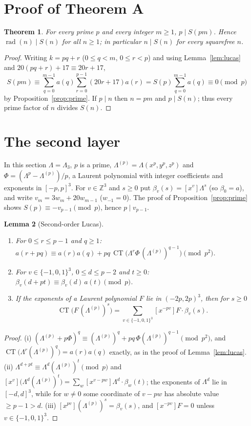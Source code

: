 \documentclass[11pt]{amsart}
\newtheorem{theorem}{Theorem}[section]
\newtheorem{lemma}[theorem]{Lemma}
\theoremstyle{definition}
\newcommand{\Z}{\mathbb{Z}}
\newcommand{\CT}{\operatorname{CT}}
\newcommand{\rad}{\operatorname{rad}}
\begin{document}
\section{Proof of Theorem A}

\begin{theorem}\label{thm:A}
For every prime $p$ and every integer $m\ge1$, $p\mid S(pm)$. Hence $\rad(n)\mid S(n)$ for all
$n\ge1$; in particular $n\mid S(n)$ for every squarefree $n$.
\end{theorem}

\begin{proof}
Writing $k=pq+r$ ($0\le q<m$, $0\le r<p$) and using Lemma~\ref{lem:lucas} and
$20(pq+r)+17\equiv20r+17$,
\[
S(pm)\equiv\sum_{q=0}^{m-1}a(q)\sum_{r=0}^{p-1}(20r+17)a(r)=S(p)\sum_{q=0}^{m-1}a(q)\equiv0
\pmod p
\]
by Proposition~\ref{prop:prime}. If $p\mid n$ then $n=pm$ and $p\mid S(n)$; thus every prime
factor of $n$ divides $S(n)$.
\end{proof}

\section{The second layer}\label{sec:layer2}

In this section $\Lambda=\Lambda_3$, $p$ is a prime, $\Lambda^{(p)}=\Lambda(x^p,y^p,z^p)$ and
$\Phi=(\Lambda^p-\Lambda^{(p)})/p$, a Laurent polynomial with integer coefficients and exponents in
$[-p,p]^3$. For $v\in\Z^3$ and $s\ge0$ put $\beta_v(s)=[x^v]\Lambda^s$ (so $\beta_0=a$), and write
$v_m=3w_m+20w_{m-1}$ ($w_{-1}=0$). The proof of Proposition~\ref{prop:prime} shows
$S(p)\equiv-v_{p-1}\pmod p$, hence $p\mid v_{p-1}$.

\begin{lemma}[Second-order Lucas]\label{lem:lucas2}
\begin{enumerate}[label=(\roman*)]
\item For $0\le r\le p-1$ and $q\ge1$:
$a(r+pq)\equiv a(r)a(q)+pq\,\CT\big(\Lambda^r\Phi\,(\Lambda^{(p)})^{q-1}\big)\pmod{p^2}$.
\item For $v\in\{-1,0,1\}^3$, $0\le d\le p-2$ and $t\ge0$: $\beta_v(d+pt)\equiv\beta_v(d)\,a(t)\pmod p$.
\item If the exponents of a Laurent polynomial $F$ lie in $(-2p,2p)^3$, then for $s\ge0$
\[\CT\big(F\,(\Lambda^{(p)})^s\big)=\sum_{v\in\{-1,0,1\}^3}[x^{-pv}]F\cdot\beta_v(s).\]
\end{enumerate}
\end{lemma}

\begin{proof}
(i) $(\Lambda^{(p)}+p\Phi)^q\equiv(\Lambda^{(p)})^q+pq\,\Phi(\Lambda^{(p)})^{q-1}\pmod{p^2}$, and
$\CT\big(\Lambda^r(\Lambda^{(p)})^q\big)=a(r)a(q)$ exactly, as in the proof of Lemma~\ref{lem:lucas}.
(ii) $\Lambda^{d+pt}\equiv\Lambda^d(\Lambda^{(p)})^t\pmod p$ and
$[x^v]\big(\Lambda^d(\Lambda^{(p)})^t\big)=\sum_{w}[x^{v-pw}]\Lambda^d\cdot\beta_w(t)$; the exponents of
$\Lambda^d$ lie in $[-d,d]^3$, while for $w\ne0$ some coordinate of $v-pw$ has absolute value
$\ge p-1>d$. (iii) $[x^{pv}](\Lambda^{(p)})^s=\beta_v(s)$, and $[x^{-pv}]F=0$ unless
$v\in\{-1,0,1\}^3$.
\end{proof}
\end{document}
